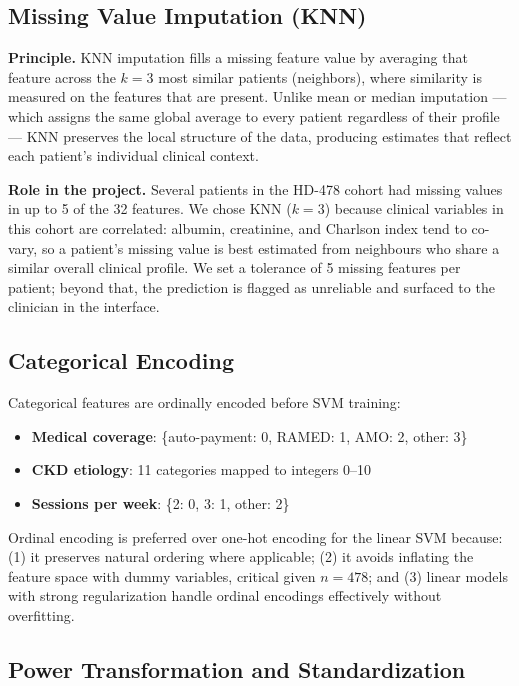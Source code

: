 \documentclass[12pt,a4paper,twoside]{report}
\begin{document}
\subsection{Missing Value Imputation (KNN)}
\label{sec:knn_imputation}

\textbf{Principle.} KNN imputation fills a missing feature value by averaging that feature across the $k=3$ most similar patients (neighbors), where similarity is measured on the features that are present. Unlike mean or median imputation — which assigns the same global average to every patient regardless of their profile — KNN preserves the local structure of the data, producing estimates that reflect each patient's individual clinical context.

\textbf{Role in the project.} Several patients in the HD-478 cohort had missing values in up to 5 of the 32 features. We chose KNN ($k=3$) because clinical variables in this cohort are correlated: albumin, creatinine, and Charlson index tend to co-vary, so a patient's missing value is best estimated from neighbours who share a similar overall clinical profile. We set a tolerance of 5 missing features per patient; beyond that, the prediction is flagged as unreliable and surfaced to the clinician in the interface.

\subsection{Categorical Encoding}

Categorical features are ordinally encoded before SVM training:
\begin{itemize}
  \item \textbf{Medical coverage}: \{auto-payment: 0, RAMED: 1, AMO: 2, other: 3\}
  \item \textbf{CKD etiology}: 11 categories mapped to integers 0--10
  \item \textbf{Sessions per week}: \{2: 0, 3: 1, other: 2\}
\end{itemize}

Ordinal encoding is preferred over one-hot encoding for the linear SVM because: (1) it preserves natural ordering where applicable; (2) it avoids inflating the feature space with dummy variables, critical given $n=478$; and (3) linear models with strong regularization handle ordinal encodings effectively without overfitting.

\subsection{Power Transformation and Standardization}
\end{document}
